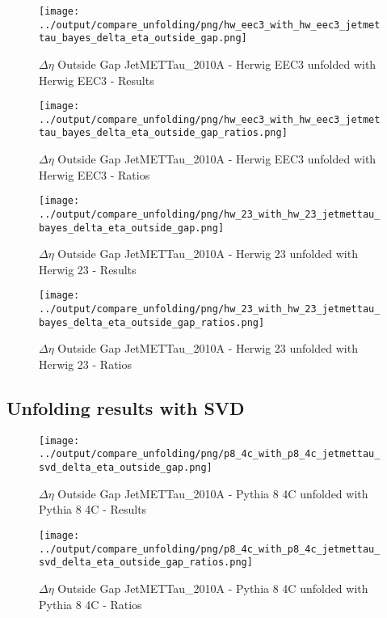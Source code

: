 \documentclass[11pt]{book}
\begin{document}
\begin{figure}[ht]
\centering
\texttt{[image: ../output/compare\_unfolding/png/hw\_eec3\_with\_hw\_eec3\_jetmettau\_bayes\_delta\_eta\_outside\_gap.png]}
\caption{$\Delta\eta$ Outside Gap JetMETTau\_2010A - Herwig EEC3 unfolded with Herwig EEC3 - Results}
\label{hw_eec3_hw_eec3_jetmettau_bayes_delta_eta_outside_gap_a}
\end{figure}

\begin{figure}[ht]
\centering
\texttt{[image: ../output/compare\_unfolding/png/hw\_eec3\_with\_hw\_eec3\_jetmettau\_bayes\_delta\_eta\_outside\_gap\_ratios.png]}
\caption{$\Delta\eta$ Outside Gap JetMETTau\_2010A - Herwig EEC3 unfolded with Herwig EEC3 - Ratios}
\label{hw_eec3_hw_eec3_jetmettau_bayes_delta_eta_outside_gap_b}
\end{figure}

\begin{figure}[ht]
\centering
\texttt{[image: ../output/compare\_unfolding/png/hw\_23\_with\_hw\_23\_jetmettau\_bayes\_delta\_eta\_outside\_gap.png]}
\caption{$\Delta\eta$ Outside Gap JetMETTau\_2010A - Herwig 23 unfolded with Herwig 23 - Results}
\label{hw_23_hw_23_jetmettau_bayes_delta_eta_outside_gap_a}
\end{figure}

\begin{figure}[ht]
\centering
\texttt{[image: ../output/compare\_unfolding/png/hw\_23\_with\_hw\_23\_jetmettau\_bayes\_delta\_eta\_outside\_gap\_ratios.png]}
\caption{$\Delta\eta$ Outside Gap JetMETTau\_2010A - Herwig 23 unfolded with Herwig 23 - Ratios}
\label{hw_23_hw_23_jetmettau_bayes_delta_eta_outside_gap_b}
\end{figure}

\clearpage
\subsection{Unfolding results with SVD}

\begin{figure}[ht]
\centering
\texttt{[image: ../output/compare\_unfolding/png/p8\_4c\_with\_p8\_4c\_jetmettau\_svd\_delta\_eta\_outside\_gap.png]}
\caption{$\Delta\eta$ Outside Gap JetMETTau\_2010A - Pythia 8 4C unfolded with Pythia 8 4C - Results}
\label{p8_p8_jetmettau_svd_delta_eta_outside_gap_a}
\end{figure}

\begin{figure}[ht]
\centering
\texttt{[image: ../output/compare\_unfolding/png/p8\_4c\_with\_p8\_4c\_jetmettau\_svd\_delta\_eta\_outside\_gap\_ratios.png]}
\caption{$\Delta\eta$ Outside Gap JetMETTau\_2010A - Pythia 8 4C unfolded with Pythia 8 4C - Ratios}
\label{p8_p8_jetmettau_svd_delta_eta_outside_gap_b}
\end{figure}
\end{document}
